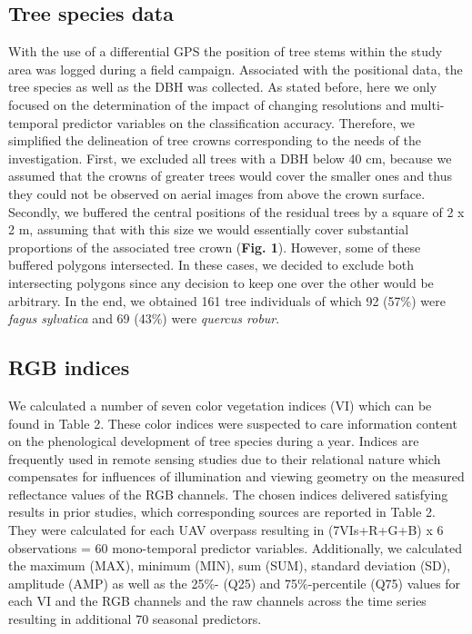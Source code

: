 \documentclass[]{article}
\begin{document}
\hypertarget{tree-species-data}{%
\subsection{Tree species data}\label{tree-species-data}}

With the use of a differential GPS the position of tree stems within the
study area was logged during a field campaign. Associated with the
positional data, the tree species as well as the DBH was collected. As
stated before, here we only focused on the determination of the impact
of changing resolutions and multi-temporal predictor variables on the
classification accuracy. Therefore, we simplified the delineation of
tree crowns corresponding to the needs of the investigation. First, we
excluded all trees with a DBH below 40 cm, because we assumed that the
crowns of greater trees would cover the smaller ones and thus they could
not be observed on aerial images from above the crown surface. Secondly,
we buffered the central positions of the residual trees by a square of 2
x 2 m, assuming that with this size we would essentially cover
substantial proportions of the associated tree crown (\textbf{Fig. 1}).
However, some of these buffered polygons intersected. In these cases, we
decided to exclude both intersecting polygons since any decision to keep
one over the other would be arbitrary. In the end, we obtained 161 tree
individuals of which 92 (57\%) were \emph{fagus sylvatica} and 69 (43\%)
were \emph{quercus robur}.

\hypertarget{rgb-indices}{%
\subsection{RGB indices}\label{rgb-indices}}

We calculated a number of seven color vegetation indices (VI) which can
be found in Table 2. These color indices were suspected to care
information content on the phenological development of tree species
during a year. Indices are frequently used in remote sensing studies due
to their relational nature which compensates for influences of
illumination and viewing geometry on the measured reflectance values of
the RGB channels. The chosen indices delivered satisfying results in
prior studies, which corresponding sources are reported in Table 2. They
were calculated for each UAV overpass resulting in (7VIs+R+G+B) x 6
observations = 60 mono-temporal predictor variables. Additionally, we
calculated the maximum (MAX), minimum (MIN), sum (SUM), standard
deviation (SD), amplitude (AMP) as well as the 25\%- (Q25) and
75\%-percentile (Q75) values for each VI and the RGB channels and the
raw channels across the time series resulting in additional 70 seasonal
predictors.
\end{document}
